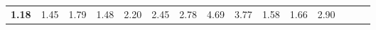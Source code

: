 \begin{tabular}{ll|rrrrrrrrr|rrrr}
  


  
  \textbf{1.18} & 1.45 & 1.79 & 1.48 & 2.20 & 2.45 & 2.78 & 4.69 & 3.77 & 1.58 & 1.66 & 2.90 &  \\


\end{tabular}
